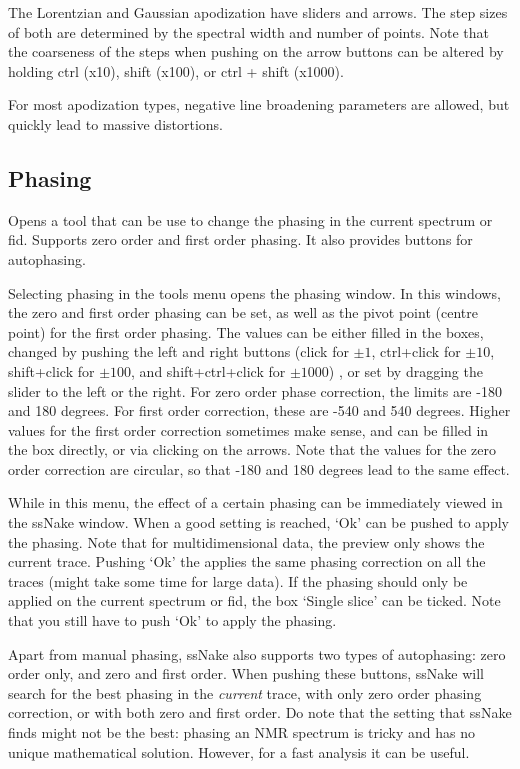 \documentclass[11pt,a4paper]{article}
\begin{document}
The Lorentzian and Gaussian apodization have sliders and arrows. The step sizes of both are
determined by the spectral width and number of points. Note that the coarseness of the steps when
pushing on the arrow buttons can be altered by holding ctrl (x10), shift (x100), or ctrl + shift
(x1000).

For most apodization types, negative line broadening parameters are allowed, but quickly lead to massive distortions.


\subsection{Phasing}
Opens a tool that can be use to change the phasing in the current spectrum or fid. Supports zero order and first order phasing. It also provides buttons for autophasing.

Selecting phasing in the tools menu opens the phasing window. In this windows, the zero and first
order phasing can be set, as well as the pivot point (centre point) for the first order phasing. The
values can be either filled in the boxes,  changed by pushing the left and right buttons (click for
$\pm1$, ctrl+click for $\pm10$, shift+click for $\pm100$, and shift+ctrl+click for $\pm1000$) , or set by dragging the slider to the
left or the right. For zero order phase correction, the limits are -180 and 180 degrees. For first
order correction, these are -540 and 540 degrees. Higher values for the first order correction
sometimes make sense, and can be filled in the box directly, or via clicking on the arrows. Note
that the values for the zero order correction are circular, so that -180 and 180 degrees lead to the
same effect.

While in this menu, the effect of a certain phasing can be immediately viewed in the ssNake window.
When a good setting is reached, `Ok' can be pushed to apply the phasing. Note that for
multidimensional data, the preview only shows the current trace. Pushing `Ok' the applies the same
phasing correction on all the traces (might take some time for large data). If the phasing should
only be applied on the current spectrum or fid, the box `Single slice' can be ticked. Note that you
still have to push `Ok' to apply the phasing.

Apart from manual phasing, ssNake also supports two types of autophasing: zero order only, and zero and first order. When pushing these buttons, ssNake will search for the best phasing in the \textit{current} trace, with only zero order phasing correction, or with both zero and first order. Do note that the setting that ssNake finds might not be the best: phasing an NMR spectrum is tricky and has no unique mathematical solution.
However, for a fast analysis it can be useful.
\end{document}
